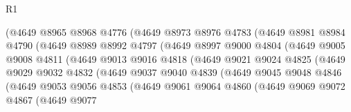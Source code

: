 \begin{lexlean}{R1}
\begin{coremodule}
                        (@4649
                          @8965
                          @8968
                          @4776
                          (@4649
                            @8973
                            @8976
                            @4783
                            (@4649
                              @8981
                              @8984
                              @4790
                              (@4649
                                @8989
                                @8992
                                @4797
                                (@4649
                                  @8997
                                  @9000
                                  @4804
                                  (@4649
                                    @9005
                                    @9008
                                    @4811
                                    (@4649
                                      @9013
                                      @9016
                                      @4818
                                      (@4649
                                        @9021
                                        @9024
                                        @4825
                                        (@4649
                                          @9029
                                          @9032
                                          @4832
                                          (@4649
                                            @9037
                                            @9040
                                            @4839
                                            (@4649
                                              @9045
                                              @9048
                                              @4846
                                              (@4649
                                                @9053
                                                @9056
                                                @4853
                                                (@4649
                                                  @9061
                                                  @9064
                                                  @4860
                                                  (@4649
                                                    @9069
                                                    @9072
                                                    @4867
                                                    (@4649
                                                      @9077

\end{coremodule}
\end{lexlean}
